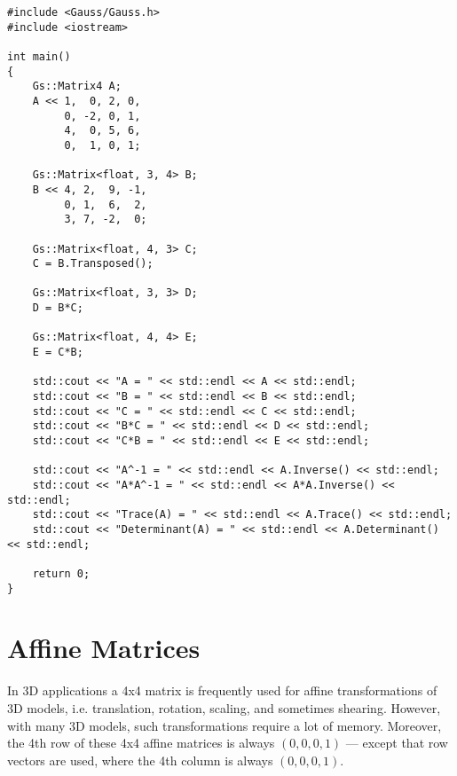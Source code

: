 \documentclass{article}
\begin{document}
\begin{lstlisting}
#include <Gauss/Gauss.h>
#include <iostream>

int main()
{
	Gs::Matrix4 A;
	A << 1,  0, 2, 0,
	     0, -2, 0, 1,
	     4,  0, 5, 6,
	     0,  1, 0, 1;
	
	Gs::Matrix<float, 3, 4> B;
	B << 4, 2,  9, -1,
	     0, 1,  6,  2,
	     3, 7, -2,  0;
	
	Gs::Matrix<float, 4, 3> C;
	C = B.Transposed();
	
	Gs::Matrix<float, 3, 3> D;
	D = B*C;
	
	Gs::Matrix<float, 4, 4> E;
	E = C*B;
	
	std::cout << "A = " << std::endl << A << std::endl;
	std::cout << "B = " << std::endl << B << std::endl;
	std::cout << "C = " << std::endl << C << std::endl;
	std::cout << "B*C = " << std::endl << D << std::endl;
	std::cout << "C*B = " << std::endl << E << std::endl;
	
	std::cout << "A^-1 = " << std::endl << A.Inverse() << std::endl;
	std::cout << "A*A^-1 = " << std::endl << A*A.Inverse() << std::endl;
	std::cout << "Trace(A) = " << std::endl << A.Trace() << std::endl;
	std::cout << "Determinant(A) = " << std::endl << A.Determinant() << std::endl;

	return 0;
}
\end{lstlisting}



\section*{Affine Matrices}
\label{sec:affine_matrices}

In 3D applications a 4x4 matrix is frequently used for affine transformations of 3D models,
i.e. translation, rotation, scaling, and sometimes shearing.
However, with many 3D models, such transformations require a lot of memory.
Moreover, the 4th row of these 4x4 affine matrices is always $(0, 0, 0, 1)$ --- except that row vectors are used,
where the 4th column is always $(0, 0, 0, 1)$.
\end{document}
